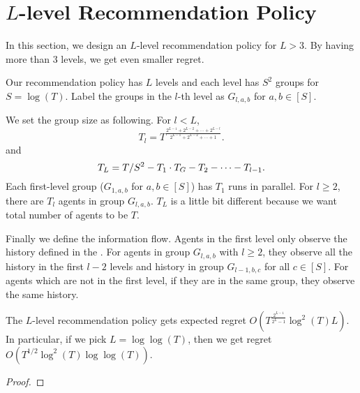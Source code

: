 
\section{$L$-level Recommendation Policy}
In this section, we design an $L$-level recommendation policy for $L > 3$. By having more than 3 levels, we get even smaller regret. 

Our recommendation policy has $L$ levels and each level has $S^2$ groups for $S = \log(T)$. Label the groups in the $l$-th level as $G_{l,a,b}$ for $a,b \in [S]$. 

We set the group size as following. For $l < L$,
\[
T_l = T^{\frac{2^{L-1} + 2^{L-2} + \cdots + 2^{L-l}}{2^{L-1}+ 2^{L-2} + \cdots + 1}}.
\]
and 
\[
T_L = T/S^2 - T_1 \cdot T_G - T_2 - \cdots - T_{l-1}. 
\]
Each first-level group ($G_{1,a,b}$ for $a,b\in [S]$) has $T_1$ \ALGG runs in parallel. For $l \geq 2$, there are $T_l$ agents in group $G_{l,a,b}$. $T_L$ is a little bit different because we want total number of agents to be $T$. 

Finally we define the information flow. Agents in the first level only observe the history defined in the \ALGG. For agents in group $G_{l,a,b}$ with $l\geq 2$, they observe all the history in the first $l-2$ levels and history in group $G_{l-1,b,c}$ for all $c \in [S]$. For agents which are not in the first level, if they are in the same group, they observe the same history.

\begin{theorem}
The $L$-level recommendation policy gets expected regret $O\left(T^{\frac{2^{L-1}}{2^L-1}} \log^2(T) L \right)$. In particular, if we pick $L = \log\log(T)$, then we get regret $O(T^{1/2} \log^2(T) \log\log(T))$.  
\end{theorem}

\begin{proof}

\end{proof}
